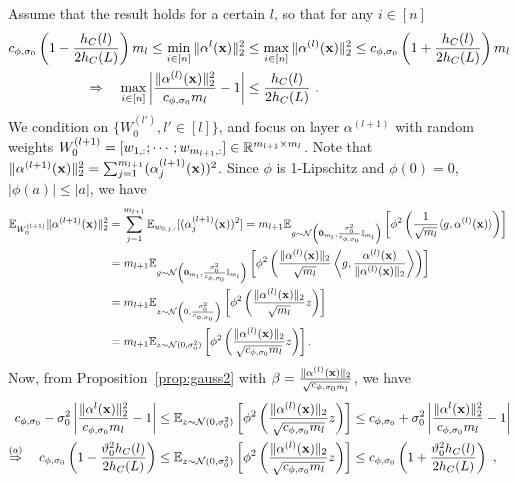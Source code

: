 Assume that the result holds for a certain $l$, so that for any $i \in [n]$
\begin{align}
c_{\phi,\sigma_0} \left(1 -  \frac{h_C(l)}{2h_C(L)}\right) m_l   \leq \min_{i \in [n]} \| \alpha^l(\mathbf{x}) \|_2^2 & \leq \max_{i \in [n]} \| \alpha^{(l)}(\mathbf{x}) \|_2^2 \leq c_{\phi,\sigma_0} \left(1 +  \frac{h_C(l)}{2h_C(L)}\right) m_l \nonumber  \\
\Rightarrow \quad \max_{i \in [n]} \left| \frac{\| \alpha^{(l)}(\mathbf{x}) \|_2^2}{c_{\phi,\sigma_0} m_l} - 1 \right| & \leq  \frac{h_C(l)}{2h_C(L)} ~.
\label{eq:rip1}
\end{align}
We condition on $\{ W_0^{(l')}, l' \in [l] \}$, and focus on layer $\alpha^{(l+1)}$ with random weights $W_0^{(l+1)} = [w_{1,:}; \cdots;w_{m_{l+1},:}] \in \mathbb{R}^{m_{l+1} \times m_l}$. Note that $\|\alpha^{(l+1)}(\mathbf{x}) \|_2^2 = \sum_{j=1}^{m_{l+1}} (\alpha^{(l+1)}_j(\mathbf{x}))^2$.  Since $\phi$ is 1-Lipschitz and $\phi(0)=0$, $|\phi(a)| \leq |a|$, we have
\begin{align}
\mathbb{E}_{W_0^{(l+1)}}\| \alpha^{(l+1)}(\mathbf{x}) \|_2^2 & = \sum_{j=1}^{m_{l+1}} \mathbb{E}_{w_{0,j,:}} [(\alpha^{(l+1)}_j(\mathbf{x}))^2] = m_{l+1} \mathbb{E}_{g \sim {\cal N}\left(\bm{0}_{m_l},\frac{\sigma_0^2}{c_{\phi,\sigma_0}} \mathbb{I}_{m_l}\right)}\left[ \phi^2\left(\frac{1}{\sqrt{m_l}}\langle g, \alpha^{(l)}(\mathbf{x}) \rangle \right) \right]~\nonumber \\
& = m_{l+1} \mathbb{E}_{g \sim {\cal N}\left(\bm{0}_{m_l},\frac{\sigma_0^2}{c_{\phi,\sigma_0}} \mathbb{I}_{m_l}\right)}\left[ \phi^2\left(\frac{\| \alpha^{(l)}(\mathbf{x})\|_2}{\sqrt{m_l}} \left\langle g, \frac{\alpha^{(l)}(\mathbf{x})}{\| \alpha^{(l)}(\mathbf{x})\|_2} \right\rangle \right) \right] \nonumber \\
& = m_{l+1}  \mathbb{E}_{z \sim {\cal N}\left(0,\frac{\sigma_0^2}{c_{\phi,\sigma_0}}\right)}\left[ \phi^2\left(\frac{\| \alpha^{(l)}(\mathbf{x})\|_2}{\sqrt{m_l}} z \right) \right] \\
& = m_{l+1}  \mathbb{E}_{z \sim {\cal N}(0,\sigma_0^2)}\left[ \phi^2\left(\frac{\| \alpha^{(l)}(\mathbf{x})\|_2}{\sqrt{c_{\phi,\sigma_0}m_l}} z \right) \right].
\label{eq:rip2}
\end{align}
Now, from Proposition~\ref{prop:gauss2} with $\beta = \frac{\| \alpha^{(l)}(\mathbf{x})\|_2}{\sqrt{c_{\phi,\sigma_0 m_l}}}$, we have 
\begin{align}
c_{\phi,\sigma_0} - \sigma_0^2 \left| \frac{\| \alpha^l(\mathbf{x}) \|_2^2}{c_{\phi,\sigma_0} m_l} - 1 \right| & \leq \mathbb{E}_{z \sim {\cal N}(0,\sigma_0^2)}\left[ \phi^2\left(\frac{\| \alpha^{(l)}(\mathbf{x})\|_2}{\sqrt{c_{\phi,\sigma_0}m_l}} z \right) \right] 
    \leq c_{\phi,\sigma_0} + \sigma_0^2 \left| \frac{\| \alpha^l(\mathbf{x}) \|_2^2}{c_{\phi,\sigma_0} m_l} - 1 \right| \nonumber \\
\overset{(a)}{\Rightarrow} \quad c_{\phi,\sigma_0}\left( 1 - \frac{\vartheta_0^2 h_C(l)}{2h_C(L)} \right) & \leq \mathbb{E}_{z \sim {\cal N}(0,\sigma_0^2)}\left[ \phi^2\left(\frac{\| \alpha^{(l)}(\mathbf{x})\|_2}{\sqrt{c_{\phi,\sigma_0} m_l}} z \right) \right] 
  \leq c_{\phi,\sigma_0}\left( 1 + \frac{\vartheta_0^2 h_C(l)}{2h_C(L)} \right)~,  
 \label{eq:rip3}
\end{align}
